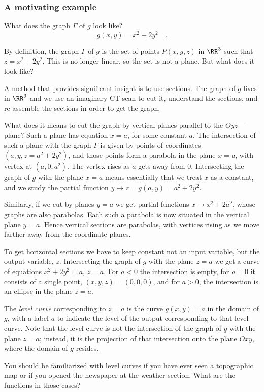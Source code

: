 \begin{frame}
\frametitle{A motivating example}
What does the graph $\Gamma$ of $g$ look like?
\[
g(x,y) =x^2+2y^2\quad .
\]



By definition, the graph $\Gamma$ of $g$ is the set of points $P(x,y,z)$ in $\RR^3$ such that $z=x^2+2y^2$. This is no longer linear, so the set is not a plane. But what does it look like?

A method that provides significant insight is to use sections. The graph of $g$ lives in $\RR^3$ and we use an imaginary CT scan to cut it, understand the sections, and re-assemble the sections in order to get the graph.

What does it means to cut the graph by vertical planes parallel to the $Oyz-$plane? Such a plane has equation $x=a$, for some constant $a$. The intersection of such a plane with the graph $\Gamma$ is given by points of coordinates $(a, y, z=a^2+2y^2)$, and those points form a parabola in the plane $x=a$, with vertex at $(a,0,a^2)$. The vertex rises as $a$ gets away from 0. Intersecting the graph of $g$ with the plane $x=a$ means
essentially that we treat $x$ as a constant, and we study
the partial function $y\to z=g(a,y) = a^2+2y^2$.

Similarly, if we cut by planes $y=a$ we get partial
functions $x\to x^2+2a^2$, whose graphs are also
parabolas. Each such a parabola is now situated in the
vertical plane $y=a$. Hence vertical sections are
parabolas, with vertices rising as
we move farther away from the coordinate planes.

To get horizontal sections we have to
keep constant not an input variable, but the output
variable, $z$. Intersecting the graph of $g$ with
the plane $z=a$ we get a curve of equations $x^2+2y^2=a$,
$z=a$. For $a<0$ the intersection is empty, for $a=0$ it
consists of a single point, $(x,y,z) = (0,0,0)$, and for
$a>0$, the intersection is an ellipse in the plane $z=a$.

The \emph{level curve} corresponding to $z=a$ is the curve
$g(x,y)=a$ in the domain of $g$, with a label $a$ to
indicate the level of the output corresponding to
that level curve. Note that the level curve is not the
intersection of the graph of $g$ with the plane $z=a$;
instead, it is the projection of that intersection onto
the plane $Oxy$, where the domain of $g$ resides.

You should be familiarized with level curves if
you have ever seen a topographic map or if you
opened the newspaper at the weather section. What are the
functions in those cases?
\end{frame}


